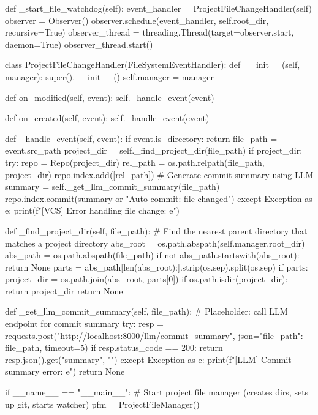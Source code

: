 \documentclass{report}
\begin{document}
\begin{python}
    def _start_file_watchdog(self):
        event_handler = ProjectFileChangeHandler(self)
        observer = Observer()
        observer.schedule(event_handler, self.root_dir, recursive=True)
        observer_thread = threading.Thread(target=observer.start, daemon=True)
        observer_thread.start()

class ProjectFileChangeHandler(FileSystemEventHandler):
    def __init__(self, manager):
        super().__init__()
        self.manager = manager

    def on_modified(self, event):
        self._handle_event(event)

    def on_created(self, event):
        self._handle_event(event)

    def _handle_event(self, event):
        if event.is_directory:
            return
        file_path = event.src_path
        project_dir = self._find_project_dir(file_path)
        if project_dir:
            try:
                repo = Repo(project_dir)
                rel_path = os.path.relpath(file_path, project_dir)
                repo.index.add([rel_path])
                # Generate commit summary using LLM
                summary = self._get_llm_commit_summary(file_path)
                repo.index.commit(summary or "Auto-commit: file changed")
            except Exception as e:
                print(f"[VCS] Error handling file change: {e}")

    def _find_project_dir(self, file_path):
        # Find the nearest parent directory that matches a project directory
        abs_root = os.path.abspath(self.manager.root_dir)
        abs_path = os.path.abspath(file_path)
        if not abs_path.startswith(abs_root):
            return None
        parts = abs_path[len(abs_root):].strip(os.sep).split(os.sep)
        if parts:
            project_dir = os.path.join(abs_root, parts[0])
            if os.path.isdir(project_dir):
                return project_dir
        return None

    def _get_llm_commit_summary(self, file_path):
        # Placeholder: call LLM endpoint for commit summary
        try:
            resp = requests.post("http://localhost:8000/llm/commit_summary", json={"file_path": file_path}, timeout=5)
            if resp.status_code == 200:
                return resp.json().get("summary", "")
        except Exception as e:
            print(f"[LLM] Commit summary error: {e}")
        return None

if __name__ == "__main__":
    # Start project file manager (creates dirs, sets up git, starts watcher)
    pfm = ProjectFileManager()


\end{python}
\end{document}
